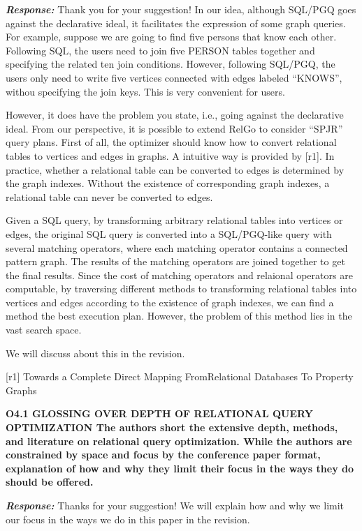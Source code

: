 \textbf{\textit{Response: }}
Thank you for your suggestion! 
In our idea, although SQL/PGQ goes against the declarative ideal, it facilitates the expression of some graph queries.
For example, suppose we are going to find five persons that know each other.
Following SQL, the users need to join five PERSON tables together and specifying the related ten join conditions.
However, following SQL/PGQ, the users only need to write five vertices connected with edges labeled ``KNOWS'', withou specifying the join keys.
This is very convenient for users.

However, it does have the problem you state, i.e., going against the declarative ideal.
From our perspective, it is possible to extend RelGo to consider ``SPJR'' query plans.
First of all, the optimizer should know how to convert relational tables to vertices and edges in graphs.
A intuitive way is provided by [r1].
In practice, whether a relational table can be converted to edges is determined by the graph indexes.
Without the existence of corresponding graph indexes, a relational table can never be converted to edges.

Given a SQL query, by transforming arbitrary relational tables into vertices or edges, the original SQL query is converted into a SQL/PGQ-like query with several matching operators, where each matching operator contains a connected pattern graph.
The results of the matching operators are joined together to get the final results.
Since the cost of matching operators and relaional operators are computable, by traversing different methods to transforming relational tables into vertices and edges according to the existence of graph indexes, we can find a method the best execution plan.
However, the problem of this method lies in the vast search space.

We will discuss about this in the revision.

[r1] Towards a Complete Direct Mapping FromRelational Databases To Property Graphs

\textbf{O4.1 GLOSSING OVER DEPTH OF RELATIONAL QUERY OPTIMIZATION
The authors short the extensive depth, methods, and literature on relational query optimization. While the authors are constrained by space and focus by the conference paper format, explanation of how and why they limit their focus in the ways they do should be offered. }

\textbf{\textit{Response: }}
Thanks for your suggestion! We will explain how and why we limit our focus in the ways we do in this paper in the revision.



